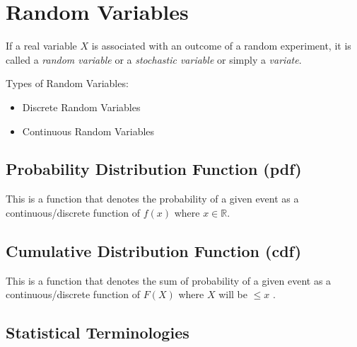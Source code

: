 \documentclass[./EngineeringMaths.tex]{subfiles}
\begin{document}
\section[Random Variables]{Random Variables}

If a real variable $X$ is associated with an outcome of a random experiment, it is called a \textit{random variable} or a \textit{stochastic variable} or simply a \textit{variate}.


Types of Random Variables:

\begin{itemize}
\item Discrete Random Variables
\item Continuous Random Variables
\end{itemize}

\subsection[Probability Distribution Function]{Probability Distribution Function (pdf)}
This is a function that denotes the probability of a given event as a continuous/discrete function of $f(x)$ where $x \in \mathbb{R}$.

\subsection[Cumulative Distribution Function]{Cumulative Distribution Function (cdf)}
This is a function that denotes the sum of probability of a given event as a continuous/discrete function of $F(X)$ where $X$ will be $ \leq x$ .

\subsection{Statistical Terminologies}
\end{document}
